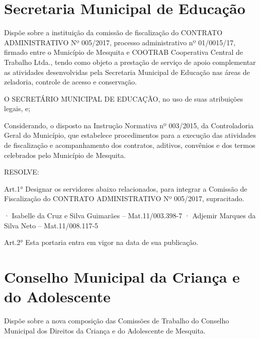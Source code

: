 \documentclass{doliberto}
\begin{document}
\thispagestyle{plain}
\maketitle
\tableofcontents

\section{Secretaria Municipal de Educação}
 

Dispõe  sobre  a  instituição  da  comissão  de  fiscalização  do 
CONTRATO  ADMINISTRATIVO  Nº  005/2017,  processo 
administrativo  nº  01/0015/17, 
firmado  entre  o 
Município de Mesquita e COOTRAB Cooperativa Central 
de  Trabalho  Ltda.,  tendo  como  objeto  a  prestação  de 
serviço de apoio complementar as atividades desenvolvidas 
pela  Secretaria  Municipal  de  Educação  nas  áreas  de 
zeladoria, controle de acesso e conservação. 
 
O  SECRETÁRIO  MUNICIPAL  DE  EDUCAÇÃO,  no  uso  de
suas atribuições legais, e; 
 
Considerando,  o  disposto  na  Instrução  Normativa  nº 
003/2015,  da  Controladoria  Geral  do  Município,  que 
estabelece  procedimentos  para  a  execução  das  atividades 
de  fiscalização  e  acompanhamento  dos  contratos,  aditivos, 
convênios  e  dos  termos  celebrados  pelo  Município  de 
Mesquita. 
 
RESOLVE: 
 
Art.1°  Designar  os  servidores  abaixo  relacionados,  para 
integrar  a  Comissão  de  Fiscalização  do  CONTRATO 
ADMINISTRATIVO Nº 005/2017, supracitado. 
 
· Isabelle da Cruz e Silva Guimarães – Mat.11/003.398-7 
· Adjemir Marques da Silva Neto – Mat.11/008.117-5 
 
Art.2°  Esta  portaria  entra  em  vigor  na  data  de  sua 
publicação. 
 


\closearticle

\section{Conselho Municipal da Criança e do Adolescente}


Dispõe  sobre  a  nova  composição  das  Comissões  de 
Trabalho  do  Conselho  Municipal  dos  Direitos  da 
Criança e do Adolescente de Mesquita.
\end{document}
